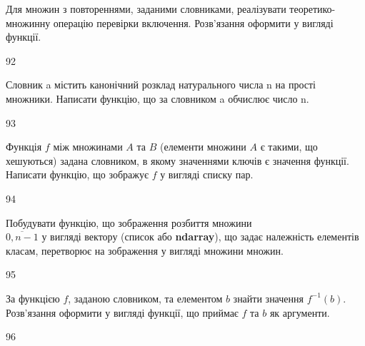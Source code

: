 Для множин з повтореннями, заданими словниками, реалізувати теоретико-множинну операцію перевірки включення. Розв'яз\-ан\-ня оформити у вигляді функції.
\\\par
92 














Словник a містить канонічний розклад натурального числа n на прості множники. Написати функцію, що за словником a обчислює число n.
\\\par
93 














Функція $f$ між множинами $A$ та $B$ (елементи множини $A$ є такими, що хешуються) задана словником, в якому значеннями ключів є значення функції. Написати функцію, що зображує $f$ у вигляді списку пар.
\\\par
94 














Побудувати функцію, що зображення розбиття множини\\ $\overline{0,n-1}$  у вигляді вектору (список або  \textbf{ndarray}), що задає належність елементів класам, перетворює на зображення у вигляді множини множин.
\\\par
95 














За функцією $f$, заданою словником, та елементом $b$ знайти значення $f^{-1}(b)$. Розв’язання оформити у вигляді функції, що приймає $f$ та $b$ як аргументи.
\\\par
96 














